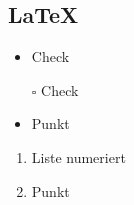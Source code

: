 \documentclass[a4paper,12pt,fleqn,parskip=half]{scrartcl}
\title{\thema}
\author{\name}
\date{\today}
\begin{document}

	\subsection*{\LaTeX}%
	\begin{itemize}[label=\checkmark] %
		\item Check
	\end{itemize}

	\begin{itemize} 
		\item [$\square$] Check
	\end{itemize}

	\begin{itemize} 
		\item Punkt
	\end{itemize}
	
	\begin{enumerate} 
		\item Liste numeriert
		\item Punkt
	\end{enumerate}


    \printbibliography[category=cited]
\end{document}
